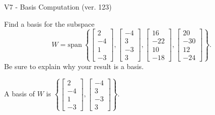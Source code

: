 \begin{exercise}
  \begin{exerciseTitle}V7 - Basis Computation (ver. 123)\end{exerciseTitle}
  \begin{exerciseStatement}
    Find a basis for the subspace 
\[W=\mathrm{span}\ \left\{\left[\begin{array}{r}
2 \\
-4 \\
1 \\
-3
\end{array}\right] , \left[\begin{array}{r}
-4 \\
3 \\
-3 \\
3
\end{array}\right] , \left[\begin{array}{r}
16 \\
-22 \\
10 \\
-18
\end{array}\right] , \left[\begin{array}{r}
20 \\
-30 \\
12 \\
-24
\end{array}\right]\right\}.\]
 Be sure to explain why your result is a basis.


  \end{exerciseStatement}
  \begin{exerciseAnswer}
   A basis of \(W\) is  \(\left\{\left[\begin{array}{r}
2 \\
-4 \\
1 \\
-3
\end{array}\right] , \left[\begin{array}{r}
-4 \\
3 \\
-3 \\
3
\end{array}\right]\right\}\).
  


  \end{exerciseAnswer}
\end{exercise}